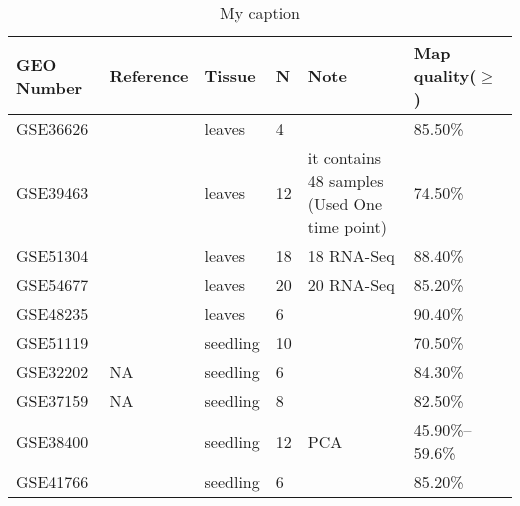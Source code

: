 \documentclass[letterpaper,12pt]{article}
\begin{document}
	\begin{landscape}
	
\begin{table}[]
	\centering
	\caption{My caption}
	\label{my-label2} 	
	\begin{tabular}{llllp{5cm}l}
		GEO Number & Reference                              & Tissue                      &N & Note                                                  & Map quality($\geq$) \\ \hline
		GSE36626   & \cite{wollmann2012dynamic}           & leaves                      & 4           &                                                       & 85.50\%                    \\
		GSE39463   & \cite{maekawa2012conservation}       & leaves                      & 12          & it contains 48 samples (Used One time point)          & 74.50\%                    \\
		GSE51304   & \cite{stroud2014non}                 & leaves                      & 18          & 18 RNA-Seq                                            & 88.40\%                    \\
		GSE54677   & \cite{moissiard2014transcriptional}  & leaves                      & 20          & 20 RNA-Seq                                            & 85.20\%                    \\
		GSE48235   & \cite{liu2014different}              & leaves                      & 6           &                                                       & 90.40\%                    \\ \hline
		GSE51119   & \cite{zhiponova2014helix}            & seedling                    & 10          &                                                       & 70.50\%                    \\
		GSE32202   & NA                                     & seedling                    & 6           &                                                       & 84.30\%                    \\
		GSE37159   & NA                                     & seedling                    & 8           &                                                       & 82.50\%                    \\
		GSE38400   & \cite{zhu2013swi}                    & seedling                    & 12          & PCA                                                   & 45.90\%--59.6\%                    \\
		GSE41766   & \cite{bai2012triple}                 & seedling                    & 6           &                                                       & 85.20\%                    \\

\end{tabular}
\end{table}
\end{landscape}
\end{document}
